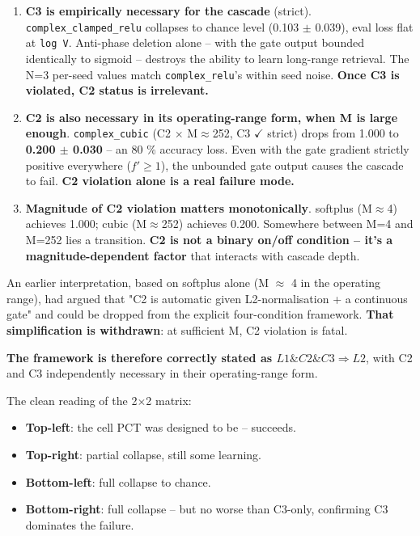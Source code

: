 \documentclass[11pt,a4paper]{article}
\theoremstyle{plain}
\theoremstyle{definition}
\begin{document}
\begin{enumerate}
  \item \textbf{C3 is empirically necessary for the cascade} (strict). \texttt{complex\_clamped\_relu} collapses to chance level (0.103 $\pm$ 0.039), eval loss flat at \texttt{log V}. Anti-phase deletion alone -- with the gate output bounded identically to sigmoid -- destroys the ability to learn long-range retrieval. The N=3 per-seed values match \texttt{complex\_relu}'s within seed noise. \textbf{Once C3 is violated, C2 status is irrelevant.}
  \item \textbf{C2 is also necessary in its operating-range form, when M is large enough}. \texttt{complex\_cubic} (C2 $\times$ M$\approx$252, C3 $\checkmark$ strict) drops from 1.000 to \textbf{0.200 $\pm$ 0.030} -- an 80 \% accuracy loss. Even with the gate gradient strictly positive everywhere ($f' \ge  1$), the unbounded gate output causes the cascade to fail. \textbf{C2 violation alone is a real failure mode.}
  \item \textbf{Magnitude of C2 violation matters monotonically}. softplus (M$\approx$4) achieves 1.000; cubic (M$\approx$252) achieves 0.200. Somewhere between M=4 and M=252 lies a transition. \textbf{C2 is not a binary on/off condition -- it's a magnitude-dependent factor} that interacts with cascade depth.
\end{enumerate}

An earlier interpretation, based on softplus alone (M $\approx$ 4 in the operating range), had argued that "C2 is automatic given L2-normalisation + a continuous gate" and could be dropped from the explicit four-condition framework. \textbf{That simplification is withdrawn}: at sufficient M, C2 violation is fatal.

\textbf{The framework is therefore correctly stated as $L1 \& C2 \& C3 \Rightarrow  L2$}, with C2 and C3 independently necessary in their operating-range form.

The clean reading of the 2$\times$2 matrix:

\begin{itemize}
  \item \textbf{Top-left}: the cell PCT was designed to be -- succeeds.
  \item \textbf{Top-right}: partial collapse, still some learning.
  \item \textbf{Bottom-left}: full collapse to chance.
  \item \textbf{Bottom-right}: full collapse -- but no worse than C3-only, confirming C3 dominates the failure.
\end{itemize}
\end{document}
